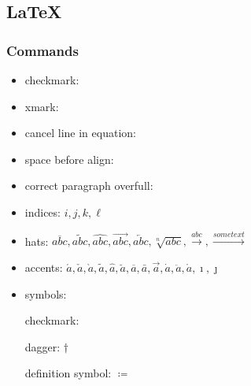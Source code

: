 \documentclass[../thesis.tex]{subfiles}
\begin{document}
\newpage

\subsection{\LaTeX}

\subsubsection*{Commands}

\begin{itemize}
	
	\item checkmark:  \cmark
	
	\item xmark:  \xmark
	
	\item cancel line in equation: 
	
	
	\item space before align:  %
	
	\item correct paragraph overfull: 
	
	\item indices: $i,j,k,\ell$
	
	\item hats: \( \overline{abc}, \widetilde{abc}, \widehat{abc}, \overrightarrow{abc}, \overleftarrow{abc}, \sqrt[n]{abc}, \xrightarrow{abc}, \xrightarrow{some text}\)
	
	\item accents: \(\acute{a}, \check{a}, \grave{a}, \widetilde{a}, \hat{a}, \breve{a}, \overline{a}, \bar{a}, \vec{a}, \dot{a}, \ddot{a}, \mathring{a}, \imath, \jmath\)
	
	\item symbols:
	
	checkmark: \checkmark 
	
	dagger: $\dagger$
	
	definition symbol: $\coloneq$
	

\end{itemize}
\end{document}
